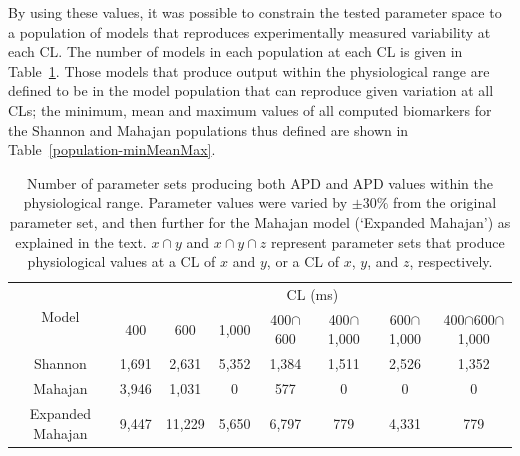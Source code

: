 \documentclass[../thesis-main.tex]{subfiles}
\begin{document}
By using these values, it was possible to constrain the tested parameter space to a population of models that reproduces experimentally measured variability at each CL. The number of models in each population at each CL is given in Table~\ref{table:population-numbers}. Those models that produce output within the physiological range are defined to be in the model population that can reproduce given variation at all CLs; the minimum, mean and maximum values of all computed biomarkers for the Shannon and Mahajan populations thus defined are shown in Table~\ref{population-minMeanMax}.
\begin{table}
 \centering
 \begin{tabular}{c|ccccccc}
  \multirow{2}{*}{Model} & \multicolumn{7}{|c}{CL (ms)} \\
  & 400 & 600 & 1,000 & 400$\cap$600 & 400$\cap$1,000 & 600$\cap$1,000 & 400$\cap$600$\cap$1,000 \\
  \hline
  \hline
  Shannon & 1,691 & 2,631 & 5,352 & 1,384 & 1,511& 2,526 & 1,352 \\
  Mahajan & 3,946 & 1,031 & 0 & 577& 0 & 0 & 0 \\
  Expanded Mahajan & 9,447 & 11,229 & 5,650 & 6,797 & 779 & 4,331 & 779
 \end{tabular}
 \caption[Number of parameter sets producing both APD and APD values within the physiological range.]{Number of parameter sets producing both APD and APD values within the physiological range. Parameter values were varied by $\pm30\%$ from the original parameter set, and then further for the Mahajan model (`Expanded Mahajan') as explained in the text. $x \cap y$ and $x \cap y \cap z$ represent parameter sets that produce physiological values at a CL of $x$ and $y$, or a CL of $x$, $y$, and $z$, respectively.}
 \label{table:population-numbers}
\end{table}
\end{document}
